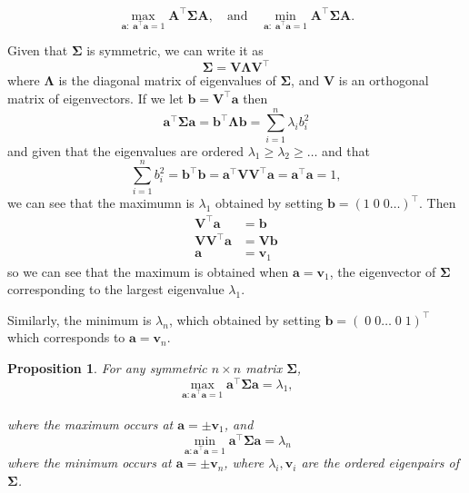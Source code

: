 \documentclass[]{book}
\newtheorem{proposition}{Proposition}[chapter]
\theoremstyle{definition}
\theoremstyle{definition}
\theoremstyle{definition}
\theoremstyle{remark}
\begin{document}
\begin{equation}
\max_{\mathbf a: \;\mathbf a^\top \mathbf a=1}\mathbf A^\top \boldsymbol{\Sigma}\mathbf A, \quad \mbox{and}\quad
\min_{\mathbf a: \;\mathbf a^\top \mathbf a=1}\mathbf A^\top \boldsymbol{\Sigma}\mathbf A.
\label{eq:eigenopt}
\end{equation}

Given that \(\boldsymbol{\Sigma}\) is symmetric, we can write it as
\[\boldsymbol{\Sigma}= \mathbf V\boldsymbol \Lambda\mathbf V^\top \]
where \(\boldsymbol \Lambda\) is the diagonal matrix of eigenvalues of \(\boldsymbol{\Sigma}\), and \(\mathbf V\) is an orthogonal matrix of eigenvectors. If we let \(\mathbf b=\mathbf V^\top \mathbf a\) then
\[\mathbf a^\top \boldsymbol{\Sigma}\mathbf a= \mathbf b^\top \boldsymbol \Lambda\mathbf b= \sum_{i=1}^n \lambda_i b_i^2\]
and given that the eigenvalues are ordered \(\lambda_1\geq \lambda_2 \geq \ldots\) and that \[\sum_{i=1}^n b_i^2=\mathbf b^\top\mathbf b=\mathbf a^\top \mathbf V\mathbf V^\top\mathbf a=\mathbf a^\top\mathbf a=1,\]
we can see that the maximumn is \(\lambda_1\) obtained by setting \(\mathbf b=(1\;0\;0 \ldots)^\top\). Then
\begin{align*}
\mathbf V^\top \mathbf a&= \mathbf b\\
\mathbf V\mathbf V^\top \mathbf a&=\mathbf V\mathbf b\\
\mathbf a&= \mathbf v_1
\end{align*}
so we can see that the maximum is obtained when \(\mathbf a=\mathbf v_1\), the eigenvector of \(\boldsymbol{\Sigma}\) corresponding to the largest eigenvalue \(\lambda_1\).

Similarly, the minimum is \(\lambda_n\), which obtained by setting \(\mathbf b=(\;0\;0 \ldots\;0\;1)^\top\) which corresponds to \(\mathbf a=\mathbf v_n\).

\begin{proposition}
\protect\hypertarget{prp:two8}{}{\label{prp:two8} }For any symmetric \(n \times n\) matrix \(\boldsymbol{\Sigma}\),
\[\max_{\mathbf a: \mathbf a^\top \mathbf a=1} \mathbf a^\top\boldsymbol{\Sigma}\mathbf a=\lambda_1,\]\\
where the maximum occurs at \(\mathbf a=\pm \mathbf v_1\), and
\[\min_{\mathbf a: \mathbf a^\top \mathbf a=1} \mathbf a^\top\boldsymbol{\Sigma}\mathbf a=\lambda_n\]
where the minimum occurs at \(\mathbf a= \pm \mathbf v_n\), where \(\lambda_i, \mathbf v_i\) are the ordered eigenpairs of \(\boldsymbol{\Sigma}\).
\end{proposition}
\end{document}
